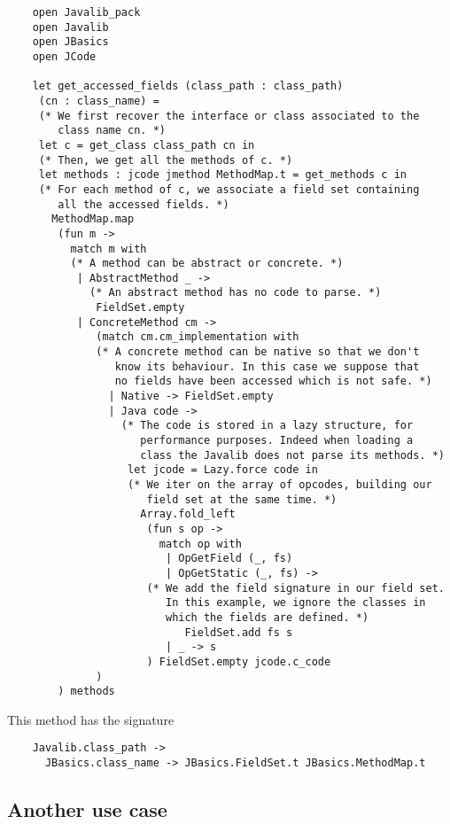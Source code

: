 \documentclass{article}
\begin{document}
\begin{verbatim}
    open Javalib_pack
    open Javalib
    open JBasics
    open JCode

    let get_accessed_fields (class_path : class_path)
     (cn : class_name) =
     (* We first recover the interface or class associated to the
        class name cn. *)
     let c = get_class class_path cn in
     (* Then, we get all the methods of c. *)
     let methods : jcode jmethod MethodMap.t = get_methods c in
     (* For each method of c, we associate a field set containing
        all the accessed fields. *)
       MethodMap.map
        (fun m ->
          match m with
          (* A method can be abstract or concrete. *)
           | AbstractMethod _ ->
             (* An abstract method has no code to parse. *)
              FieldSet.empty
           | ConcreteMethod cm ->
              (match cm.cm_implementation with
              (* A concrete method can be native so that we don't
                 know its behaviour. In this case we suppose that
                 no fields have been accessed which is not safe. *)
                | Native -> FieldSet.empty
                | Java code ->
                  (* The code is stored in a lazy structure, for
                     performance purposes. Indeed when loading a
                     class the Javalib does not parse its methods. *)
                   let jcode = Lazy.force code in
                   (* We iter on the array of opcodes, building our
                      field set at the same time. *)
                     Array.fold_left
                      (fun s op ->
                        match op with
                         | OpGetField (_, fs)
                         | OpGetStatic (_, fs) ->
                      (* We add the field signature in our field set.
                         In this example, we ignore the classes in
                         which the fields are defined. *)
                            FieldSet.add fs s
                         | _ -> s
                      ) FieldSet.empty jcode.c_code
              )
        ) methods
\end{verbatim}
This method has the signature

\begin{verbatim}
    Javalib.class_path ->
      JBasics.class_name -> JBasics.FieldSet.t JBasics.MethodMap.t
\end{verbatim}
\subsection{Another use case}
\end{document}
